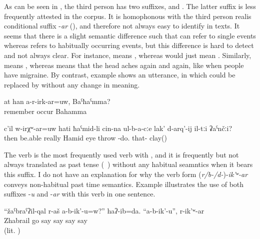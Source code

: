 As can be seen in , the third person has two suffixes,  and . The latter suffix is less frequently attested in the corpus. It is homophonous with the third person realis conditional suffix -\textit{ar} (), and therefore not always easy to identify in texts. It seems that there is a slight semantic difference such that  can refer to single events whereas  refers to habitually occurring events, but this difference is hard to detect and not always clear. For instance,  means , whereas  would just mean . Similarly,  means , whereas  means that the head aches again and again, like when people have migraine.
By contrast, example  shows an utterance, in which  could be replaced by  without any change in meaning.  
\begin{exe}
	\ex	\label{ex:Don't you remember her, Bahamma}
	\gll	at	han	a-r-irk-ar=uw,	Baˁħaˁmma?	\\
			remember	occur		Bahamma\\
	\glt	{}
	
	\ex	\label{ex:Can Hamid really throw clay into his eyes}
	\gll	c'il	w-irχʷ-ar=uw	hati	ħaˁmid-li	cin-na	ul-b-a-cːe	lak'	d-arq'-ij	il-tːi	ʡaˁnčːi?\\
		then	be.able	really	Hamid		eye	throw	-do.	that-	clay()\\
	\glt	{}
\end{exe}

The verb   is the most frequently used verb with , and it is frequently but not always translated as past tense (\tie\ ) without any habitual seamntics  when it bears this suffix. I do not have an explanation for why the verb form (\textit{r/b-/d-})-\textit{ik'ʷ-ar} conveys non-habitual past time semantics. Example  illustrates the use of both suffixes -\textit{u} and -\textit{ar} with this verb in one sentence. 

\begin{exe}
	\ex	\label{ex:Zhabrail and his family do not invite you}
	\gll	``žaˁbraˁʔil-qal	r-aš	a-b-ik'-u=w?''	haʔ-ib=da.	``a-b-ik'-u'',	r-ik'ʷ-ar\\
		Zhabrail	go	say	say	say	say\\
	\glt	{} (lit. )
\end{exe}


